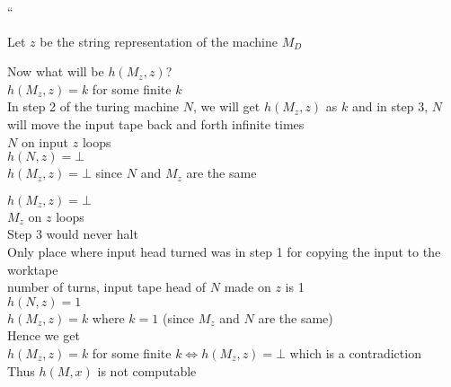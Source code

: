 ``

Let $z$ be the string representation of the machine $M_D$

Now what will be $h(M_z, z)$?\\

$h(M_z, z) = k$ for some finite $k$\\
\imp
In step 2 of the turing machine $N$, we will get $h(M_z, z)$ as $k$ and in step 3, $N$ will
move the input tape back and forth infinite times\\
\imp
$N$ on input $z$ loops\\
\imp $h(N, z) = \bot$\\
\imp $h(M_z, z) = \bot$ since $N$ and $M_z$ are the same

$h(M_z, z) = \bot$\\
\imp $M_z$ on $z$ loops\\
\imp Step 3 would never halt\\
\imp Only place where input head turned was in step 1 for copying the input to the worktape\\
\imp number of turns, input tape head of $N$ made on $z$ is 1\\
\imp $h(N, z) = 1$\\
\imp $h(M_z, z) = k$ where $k = 1$ (since $M_z$ and $N$ are the same)\\

Hence we get\\
$h(M_z, z) = k$ for some finite $k \Leftrightarrow h(M_z, z) = \bot$ 
which is a contradiction\\
Thus $h(M, x)$ is not computable









